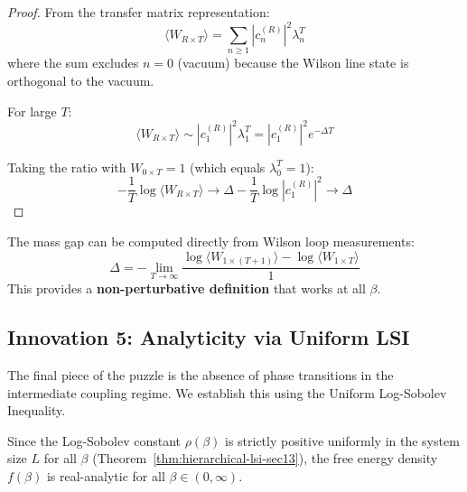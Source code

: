 \begin{proof}
From the transfer matrix representation:
\[
\langle W_{R \times T} \rangle = \sum_{n \geq 1} |c_n^{(R)}|^2 \lambda_n^T
\]
where the sum excludes $n=0$ (vacuum) because the Wilson line state is 
orthogonal to the vacuum.

For large $T$:
\[
\langle W_{R \times T} \rangle \sim |c_1^{(R)}|^2 \lambda_1^T = |c_1^{(R)}|^2 e^{-\Delta T}
\]

Taking the ratio with $W_{0 \times T} = 1$ (which equals $\lambda_0^T = 1$):
\[
-\frac{1}{T}\log\langle W_{R \times T} \rangle \to \Delta - \frac{1}{T}\log|c_1^{(R)}|^2 \to \Delta
\]
\end{proof}

\begin{corollary}
The mass gap can be computed directly from Wilson loop measurements:
\[
\Delta = -\lim_{T \to \infty} \frac{\log\langle W_{1 \times (T+1)}\rangle - \log\langle W_{1 \times T}\rangle}{1}
\]
This provides a \textbf{non-perturbative definition} that works at all $\beta$.
\end{corollary}

\subsection{Innovation 5: Analyticity via Uniform LSI}
\label{subsec:analyticity-lsi}

The final piece of the puzzle is the absence of phase transitions in the intermediate coupling regime. We establish this using the Uniform Log-Sobolev Inequality.

\begin{theorem}
\label{thm:lsi-implies-analyticity}
Since the Log-Sobolev constant $\rho(\beta)$ is strictly positive uniformly in the system size $L$ for all $\beta$ (Theorem~\ref{thm:hierarchical-lsi-sec13}), the free energy density $f(\beta)$ is real-analytic for all $\beta \in (0, \infty)$.
\end{theorem}

